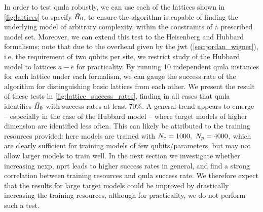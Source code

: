 In order to test \gls{qmla} robustly, 
we can use each of the lattices shown in \cref{fig:lattices} to specify $\hat{H}_0$, 
to ensure the algorithm is capable of finding the underlying model of arbitrary complexity, 
within the constraints of a prescribed model set\footnotemark. 
Moreover, we can extend this test to the Heisenberg and Hubbard formalisms; 
note that due to the overhead given by the \gls{jwt} (\cref{sec:jordan_wigner}), i.e. the requirement of two qubits per site, 
we restrict study of the Hubbard model to lattices $a-e$ for practicality\footnotemark.
By running 10 independent \gls{qmla} \glspl{instance} for each lattice under each formalism,
we can gauge the success rate of the algorithm for distinguishing basic lattices from each other. 
We present the result of these tests in \cref{fig:lattice_success_rates},   
finding in all cases that \gls{qmla} identifies $\hat{H}_0$ with \glspl{success rate} at least $70\%$. 
A general trend appears to emerge -- especially in the case of the Hubbard model --
where target models of higher dimension are identified less often. 
This can likely be attributed to the training resources provided:
here models are trained with $N_e=1000, \ N_p=4000$, 
which are clearly sufficient for training models of few qubits/parameters, 
but may not allow larger models to train well.  
In the next section we investigate whether increasing \gls{nexp}, \gls{nprt} leads to higher \glspl{success rate} in general, 
and find a strong correlation between training resources and \gls{qmla} \gls{success rate}. 
We therefore expect that the results for large target models could be improved by drastically increasing the training resources, 
although for practicality, we do not perform such a test.
\par 


